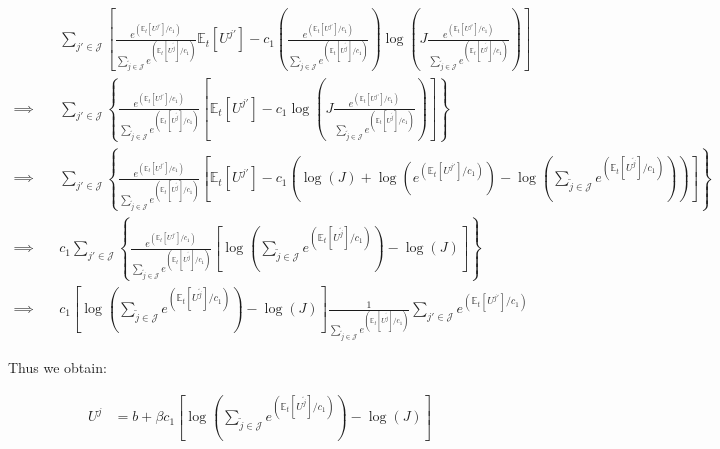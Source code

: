 \documentclass[
  letterpaper,
  DIV=11,
  numbers=noendperiod]{scrreprt}
\begin{document}
\begin{align*}
& \sum_{j'\in \mathcal{J}} \left[ \frac{e^{\left(\mathbb{E}_t\left[U^{j'}\right] /c_1\right)}}{\sum_{\tilde{j}\in \mathcal{J}}e^{\left(\mathbb{E}_t\left[U^{\tilde{j}}\right] /c_1\right)}}\mathbb{E}_t\left[U^{j'} \right]
- c_1\left( \frac{e^{\left(\mathbb{E}_t\left[U^{j'}\right] /c_1\right)}}{\sum_{\tilde{j}\in \mathcal{J}}e^{\left(\mathbb{E}_t\left[U^{\tilde{j}}\right] /c_1\right)}}\right)\log{\left(J \frac{e^{\left(\mathbb{E}_t\left[U^{j'}\right] /c_1\right)}}{\sum_{\tilde{j}\in \mathcal{J}}e^{\left(\mathbb{E}_t\left[U^{\tilde{j}}\right] /c_1\right)}}\right)} \right]\\
\implies \quad & \sum_{j'\in \mathcal{J}} \left\{\frac{e^{\left(\mathbb{E}_t\left[U^{j'}\right] /c_1\right)}}{\sum_{\tilde{j}\in \mathcal{J}}e^{\left(\mathbb{E}_t\left[U^{\tilde{j}}\right] /c_1\right)}} \left[\mathbb{E}_t\left[U^{j'} \right]
- c_1\log{\left(J \frac{e^{\left(\mathbb{E}_t\left[U^{j'}\right] /c_1\right)}}{\sum_{\tilde{j}\in \mathcal{J}}e^{\left(\mathbb{E}_t\left[U^{\tilde{j}}\right] /c_1\right)}}\right)} \right]\right\}\\
  \implies \quad & 
\sum_{j'\in \mathcal{J}} \left\{\frac{e^{\left(\mathbb{E}_t\left[U^{j'}\right] /c_1\right)}}{\sum_{\tilde{j}\in \mathcal{J}}e^{\left(\mathbb{E}_t\left[U^{\tilde{j}}\right] /c_1\right)}} \left[{\mathbb{E}_t\left[U^{j'} \right]}
- c_1\left(\log{\left(J\right)} + {\log{\left(e^{\left(\mathbb{E}_t\left[U^{j'}\right] /c_1\right)}\right)}} - \log{\left(\sum_{\tilde{j}\in \mathcal{J}}e^{\left(\mathbb{E}_t\left[U^{\tilde{j}}\right] /c_1\right)}\right)}\right)\right]\right\}\\   \implies\quad&
c_1\sum_{j'\in \mathcal{J}}\left\{ \frac{e^{\left(\mathbb{E}_t\left[U^{j'}\right] /c_1\right)}}{\sum_{\tilde{j}\in \mathcal{J}}e^{\left(\mathbb{E}_t\left[U^{\tilde{j}}\right] /c_1\right)}} \left[
\log{\left(\sum_{\tilde{j}\in \mathcal{J}}e^{\left(\mathbb{E}_t\left[U^{\tilde{j}}\right] /c_1\right)}\right)} - \log{\left(J\right)} \right]\right\}\\
\implies\quad&c_1\left[
\log{\left(\sum_{\tilde{j}\in \mathcal{J}}e^{\left(\mathbb{E}_t\left[U^{\tilde{j}}\right] /c_1\right)}\right)} - \log{\left(J\right)} \right] {\frac{1}{\sum_{\tilde{j}\in \mathcal{J}}e^{\left(\mathbb{E}_t\left[U^{\tilde{j}}\right] /c_1\right)}} }{\sum_{j'\in \mathcal{J}}e^{\left(\mathbb{E}_t\left[U^{j'}\right] /c_1\right)}} 
\end{align*}

Thus we obtain:

\begin{align*}
U^{j} &= b + \beta c_1\left[
\log{\left(\sum_{\tilde{j}\in \mathcal{J}}e^{\left(\mathbb{E}_t\left[U^{\tilde{j}}\right] /c_1\right)}\right)} - \log{\left(J\right)} \right]
\end{align*}
\end{document}
